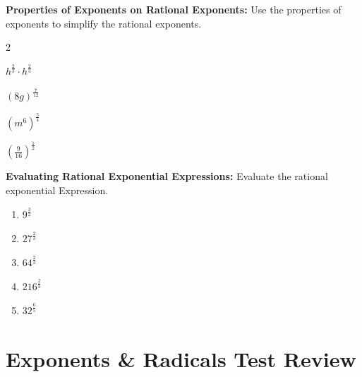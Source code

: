 \documentclass[12pt]{article}
\begin{document}
\textbf{Properties of Exponents on Rational Exponents:} Use the properties of exponents to simplify the rational exponents.\\

	\begin{enumerate}[resume]
	\end{enumerate}	

\textbf{Evaluating Rational Exponential Expressions:} Evaluate the rational exponential Expression.\\

	\begin{enumerate}[resume]
		\setlength\itemsep{1cm}
	
		\item $9^{\frac{3}{2}}$\\
		
		\item $27^{\frac{2}{3}}$\\
		
		\item $64^{\frac{2}{3}}$\\
		
		\item $216^{\frac{2}{3}}$\\
		
		\item $32^{\frac{6}{5}}$\\
	
	\end{enumerate}
	
\section{Exponents \& Radicals Test Review}
\end{document}
